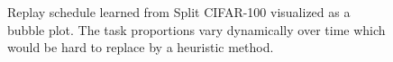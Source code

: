 
\begin{figure}[t]
  \centering
  \setlength{\figwidth}{0.58\textwidth}
  \setlength{\figheight}{.42\textwidth}
  
  \vspace{-3mm}
  \caption{ Replay schedule learned from Split CIFAR-100 visualized as a bubble plot. %
  The task proportions vary dynamically over time which would be hard to replace by a heuristic method. 
  } 
  \vspace{-3mm}
  \label{fig:replay_schedule_vis_cifar100}
\end{figure}